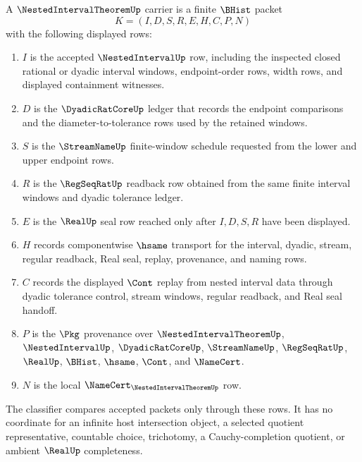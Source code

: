 \begin{definition}
\label{def:nested-interval-theorem-carrier}
A $\NestedIntervalTheoremUp$ carrier is a finite $\BHist$ packet
$$
K=(I,D,S,R,E,H,C,P,N)
$$
with the following displayed rows:
\begin{enumerate}
\item $I$ is the accepted $\NestedIntervalUp$ row, including the inspected closed rational or dyadic interval windows, endpoint-order rows, width rows, and displayed containment witnesses.
\item $D$ is the $\DyadicRatCoreUp$ ledger that records the endpoint comparisons and the diameter-to-tolerance rows used by the retained windows.
\item $S$ is the $\StreamNameUp$ finite-window schedule requested from the lower and upper endpoint rows.
\item $R$ is the $\RegSeqRatUp$ readback row obtained from the same finite interval windows and dyadic tolerance ledger.
\item $E$ is the $\RealUp$ seal row reached only after $I,D,S,R$ have been displayed.
\item $H$ records componentwise $\hsame$ transport for the interval, dyadic, stream, regular readback, Real seal, replay, provenance, and naming rows.
\item $C$ records the displayed $\Cont$ replay from nested interval data through dyadic tolerance control, stream windows, regular readback, and Real seal handoff.
\item $P$ is the $\Pkg$ provenance over $\NestedIntervalTheoremUp$, $\NestedIntervalUp$, $\DyadicRatCoreUp$, $\StreamNameUp$, $\RegSeqRatUp$, $\RealUp$, $\BHist$, $\hsame$, $\Cont$, and $\NameCert$.
\item $N$ is the local $\NameCert_{\NestedIntervalTheoremUp}$ row.
\end{enumerate}
The classifier compares accepted packets only through these rows. It has no coordinate for an infinite host intersection object, a selected quotient representative, countable choice, trichotomy, a Cauchy-completion quotient, or ambient $\RealUp$ completeness.
\end{definition}

